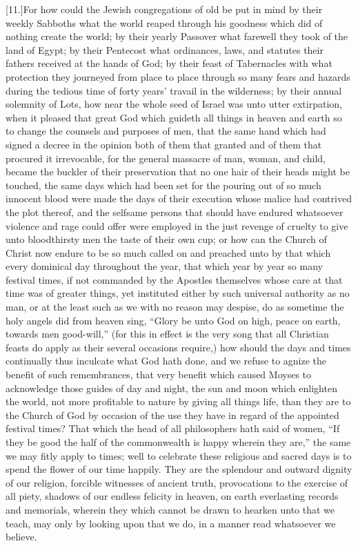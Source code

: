 [11.]For how could the Jewish congregations of old be put in mind by their weekly Sabboths what the world reaped through his goodness which did of nothing create the world; by their yearly Passover what farewell they took of the land of Egypt; by their Pentecost what ordinances, laws, and statutes their fathers received at the hands of God; by their feast of Tabernacles with what protection they journeyed from place to place through so many fears and hazards during the tedious time of forty years’ travail in the wilderness; by their annual solemnity of Lots, how near the whole seed of Israel was unto utter extirpation, when it pleased that great God which guideth all things in heaven and earth so to change the counsels and purposes of men, that the same hand which had signed a decree in the opinion both of them that granted and of them that procured it irrevocable, for the general massacre of man, woman, and child, became the buckler of their preservation that no one hair of their heads might be touched, the same days which had been set for the pouring out of so much innocent blood were made the days of their execution  whose malice had contrived the plot thereof, and the selfsame persons that should have endured whatsoever violence and rage could offer were employed in the just revenge of cruelty to give unto bloodthirsty men the taste of their own cup;
 or how can the Church of Christ now endure to be so much called on and preached unto by that which every dominical day throughout the year, that which year by year so many festival times, if not commanded by the Apostles themselves whose care at that time was of greater things, yet instituted either by such universal authority as no man, or at the least such as we with no reason may despise, do as sometime the holy angels did from heaven sing, “Glory be unto God on high, peace on earth, towards men good-will,” (for this in effect is the very song that all Christian feasts do apply as their several occasions require,) how should the days and times continually thus inculcate what God hath done, and we refuse to agnize the benefit of such remembrances, that very benefit which caused Moyses to acknowledge those guides of day and night, the sun and moon which enlighten the world, not more profitable to nature by giving all things life, than they are to the Church of God by occasion of the use they have in regard of the appointed festival times? That which the head of all philosophers hath said of women, “If they be good the half of the commonwealth is happy wherein they are,” the same we may fitly apply to times; well to celebrate these religious and sacred days is to spend the flower of our time happily. They are the splendour and outward dignity of our religion, forcible witnesses of ancient truth,  provocations to the exercise of all piety,
 shadows of our endless felicity in heaven, on earth everlasting records and memorials, wherein they which cannot be drawn to hearken unto that we teach, may only by looking upon that we do, in a manner read whatsoever we believe.


